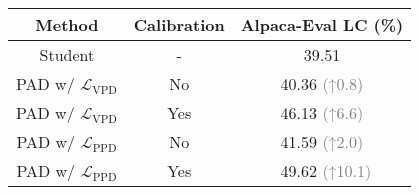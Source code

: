 \begin{table}[!tp]
\small
\centering
\setlength{\tabcolsep}{.8em}
\renewcommand{\arraystretch}{1.4}

\begin{tabular}{ccc}
\hline
\textbf{Method} & \textbf{Calibration} & \textbf{Alpaca-Eval LC (\%)} \\ 
\hline
Student & - & 39.51 \\
\hline
PAD w/ $\mathcal{L}_\text{VPD}$       & No                         & 40.36 \textcolor{gray}{\scriptsize{(↑0.8)}}                          \\
PAD w/ $\mathcal{L}_\text{VPD}$       & Yes                        & 46.13 \textcolor{gray}{\scriptsize{(↑6.6)}} \\
\hline
PAD w/ $\mathcal{L}_\text{PPD}$       & No                         & 41.59 \textcolor{gray}{\scriptsize{(↑2.0)}}
                          \\
PAD w/ $\mathcal{L}_\text{PPD}$       & Yes                        &\ 49.62 \textcolor{gray}{\scriptsize{(↑10.1)}}                         \\
\bottomrule
\end{tabular}
\vspace{-0.15cm}
\caption{}
\vspace{-0.4cm}
\label{tab:reward_ablation}
\end{table}
